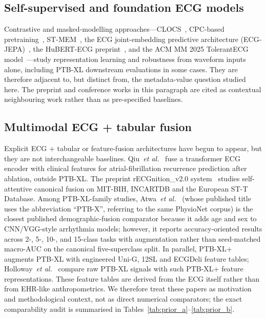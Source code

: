 \documentclass[mathematics,article,submit,pdftex]{Definitions/mdpi}
\begin{document}
\subsection{Self-supervised and foundation ECG models}
Contrastive and masked-modelling approaches---CLOCS~\cite{Kiyasseh2021}, CPC-based pretraining~\cite{Mehari2022}, ST-MEM~\cite{Na2024}, the ECG joint-embedding predictive architecture (ECG-JEPA)~\cite{Weimann2025}, the HuBERT-ECG preprint~\cite{Coppola2024}, and the ACM MM 2025 TolerantECG model~\cite{Nguyen2025}---study representation learning and robustness from waveform inputs alone, including PTB-XL downstream evaluations in some cases. They are therefore adjacent to, but distinct from, the metadata-value question studied here. The preprint and conference works in this paragraph are cited as contextual neighbouring work rather than as pre-specified baselines.

\subsection{Multimodal ECG + tabular fusion}
Explicit ECG + tabular or feature-fusion architectures have begun to appear, but they are not interchangeable baselines. Qiu~\textit{et al.}~\cite{Qiu2024} fuse a transformer ECG encoder with clinical features for atrial-fibrillation recurrence prediction after ablation, outside PTB-XL. The preprint rECGnition\_v2.0 system~\cite{Srivastava2025} studies self-attentive canonical fusion on MIT-BIH, INCARTDB and the European ST-T Database. Among PTB-XL-family studies, Atwa~\textit{et al.}~\cite{Atwa2025} (whose published title uses the abbreviation ``PTB-X'', referring to the same PhysioNet corpus) is the closest published demographic-fusion comparator because it adds age and sex to CNN/VGG-style arrhythmia models; however, it reports accuracy-oriented results across 2-, 5-, 10-, and 15-class tasks with augmentation rather than seed-matched macro-AUC on the canonical five-superclass split. In parallel, PTB-XL+~\cite{Strodthoff2023PTBXLPlus} augments PTB-XL with engineered Uni-G, 12SL and ECGDeli feature tables; Holloway~\textit{et al.}~\cite{Holloway2026} compare raw PTB-XL signals with such PTB-XL+ feature representations. These feature tables are derived from the ECG itself rather than from EHR-like anthropometrics. We therefore treat these papers as motivation and methodological context, not as direct numerical comparators; the exact comparability audit is summarised in Tables~\ref{tab:prior_a}--\ref{tab:prior_b}.
\end{document}
